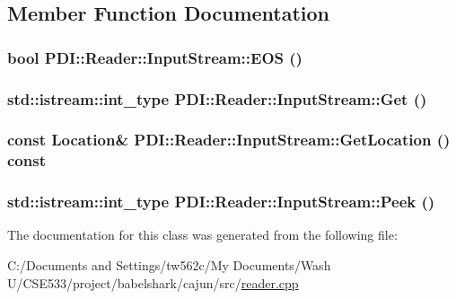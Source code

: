 \subsection{Member Function Documentation}
\hypertarget{class_p_d_i_1_1_reader_1_1_input_stream_4f01b76d52ea6bfdc320aa353237d484}{
\subsubsection[{EOS}]{\setlength{\rightskip}{0pt plus 5cm}bool PDI::Reader::InputStream::EOS ()}}
\label{class_p_d_i_1_1_reader_1_1_input_stream_4f01b76d52ea6bfdc320aa353237d484}


\hypertarget{class_p_d_i_1_1_reader_1_1_input_stream_4307268a3956a0d43430d91fd85a188b}{
\subsubsection[{Get}]{\setlength{\rightskip}{0pt plus 5cm}std::istream::int\_\-type PDI::Reader::InputStream::Get ()}}
\label{class_p_d_i_1_1_reader_1_1_input_stream_4307268a3956a0d43430d91fd85a188b}


\hypertarget{class_p_d_i_1_1_reader_1_1_input_stream_c13f1e12d498fa1d2a12d22da984975a}{
\subsubsection[{GetLocation}]{\setlength{\rightskip}{0pt plus 5cm}const {\bf Location}\& PDI::Reader::InputStream::GetLocation () const}}
\label{class_p_d_i_1_1_reader_1_1_input_stream_c13f1e12d498fa1d2a12d22da984975a}


\hypertarget{class_p_d_i_1_1_reader_1_1_input_stream_226c12eeb246955dd9335434a344d073}{
\subsubsection[{Peek}]{\setlength{\rightskip}{0pt plus 5cm}std::istream::int\_\-type PDI::Reader::InputStream::Peek ()}}
\label{class_p_d_i_1_1_reader_1_1_input_stream_226c12eeb246955dd9335434a344d073}




The documentation for this class was generated from the following file:\begin{CompactItemize}
\item 
C:/Documents and Settings/tw562c/My Documents/Wash U/CSE533/project/babelshark/cajun/src/\hyperlink{reader_8cpp}{reader.cpp}\end{CompactItemize}
